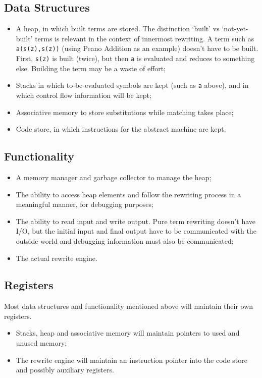 \documentclass[11pt,twoside]{memoir}
\def\T{\texttt}
\begin{document}
\subsection{Data Structures}
\begin{itemize}
\item A heap, in which built terms are stored. The distinction `built' vs `not-yet-built' terms is relevant in the context of innermost rewriting. A term such as \T{a(s(z),s(z))} (using Peano Addition \cite{code:pa} as an example) doesn't have to be built. First, \T{s(z)} is built (twice), but then \T{a} is evaluated and reduces to something else. Building the term may be a waste of effort;
\item Stacks in which to-be-evaluated symbols are kept (such as \T{a} above), and in which control flow information will be kept;
\item Associative memory to store substitutions while matching takes place;
\item Code store, in which instructions for the abstract machine are kept.
\end{itemize}

\subsection{Functionality}
\begin{itemize}
\item A memory manager and garbage collector to manage the heap;
\item The ability to access heap elements and follow the rewriting process in a meaningful manner, for debugging purposes;
\item The ability to read input and write output. Pure term rewriting doesn't have I/O, but the initial input and final output have to be communicated with the outside world and debugging information must also be communicated; 
\item The actual rewrite engine.
\end{itemize}

\subsection{Registers}
Most data structures and functionality mentioned above will maintain their own registers. 
\begin{itemize}
\item Stacks, heap and associative memory will maintain pointers to used and unused memory; 
\item The rewrite engine will maintain an instruction pointer into the code store and possibly auxiliary registers.
\end{itemize}
\end{document}
